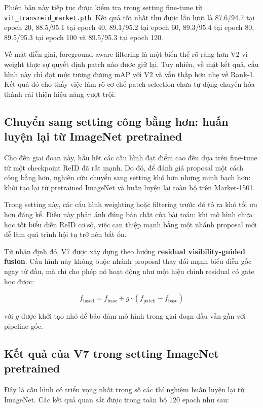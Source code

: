 Phiên bản này tiếp tục được kiểm tra trong setting fine-tune từ \texttt{vit\_transreid\_market.pth}. Kết quả tốt nhất thu được lần lượt là 87.6/94.7 tại epoch 20, 88.5/95.1 tại epoch 40, 89.1/95.2 tại epoch 60, 89.3/95.4 tại epoch 80, 89.5/95.3 tại epoch 100 và 89.5/95.3 tại epoch 120.

Về mặt diễn giải, foreground-aware filtering là một biến thể rõ ràng hơn V2 vì weight thực sự quyết định patch nào được giữ lại. Tuy nhiên, về mặt kết quả, cấu hình này chỉ đạt mức tương đương mAP với V2 và vẫn thấp hơn nhẹ về Rank-1. Kết quả đó cho thấy việc làm rõ cơ chế patch selection chưa tự động chuyển hóa thành cải thiện hiệu năng vượt trội.

\subsection{Chuyển sang setting công bằng hơn: huấn luyện lại từ ImageNet pretrained}

Cho đến giai đoạn này, hầu hết các cấu hình đạt điểm cao đều dựa trên fine-tune từ một checkpoint ReID đã rất mạnh. Do đó, để đánh giá proposal một cách công bằng hơn, nghiên cứu chuyển sang setting khó hơn nhưng minh bạch hơn: khởi tạo lại từ pretrained ImageNet và huấn luyện lại toàn bộ trên Market-1501.

Trong setting này, các cấu hình weighting hoặc filtering trước đó tỏ ra khó tối ưu hơn đáng kể. Điều này phản ánh đúng bản chất của bài toán: khi mô hình chưa học tốt biểu diễn ReID cơ sở, việc can thiệp mạnh bằng một nhánh proposal mới dễ làm quá trình hội tụ trở nên bất ổn.

Từ nhận định đó, V7 được xây dựng theo hướng \textbf{residual visibility-guided fusion}. Cấu hình này không buộc nhánh proposal thay đổi mạnh biểu diễn gốc ngay từ đầu, mà chỉ cho phép nó hoạt động như một hiệu chỉnh residual có gate học được:

\[
f_{\text{fused}} = f_{\text{base}} + g \cdot (f_{\text{patch}} - f_{\text{base}})
\]

với \(g\) được khởi tạo nhỏ để bảo đảm mô hình trong giai đoạn đầu vẫn gần với pipeline gốc.

\subsection{Kết quả của V7 trong setting ImageNet pretrained}

Đây là cấu hình có triển vọng nhất trong số các thí nghiệm huấn luyện lại từ ImageNet. Các kết quả quan sát được trong toàn bộ 120 epoch như sau:


